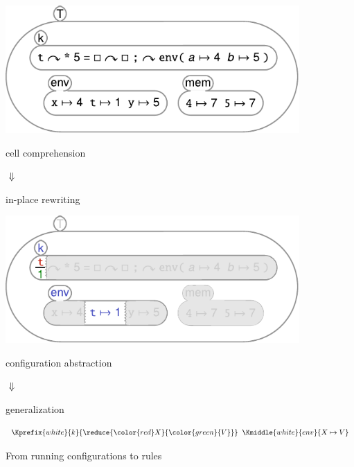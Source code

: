 \documentclass{article}
\begin{document}
\begin{figure}
\begin{center}
\includegraphics{figs/read-env-2}
\end{center}
\begin{minipage}{.44\columnwidth}
\begin{flushright}
cell comprehension
\end{flushright}
\end{minipage}
{\Huge$\mbox{\normalsize}\Downarrow\mbox{\normalsize }$}
\begin{minipage}{.44\columnwidth}
in-place rewriting
\end{minipage}
\begin{center}
\includegraphics{figs/read-env2}
\end{center}
\begin{minipage}{.44\columnwidth}
\begin{flushright}
configuration abstraction
\end{flushright}
\end{minipage}
{\Huge$\mbox{\normalsize}\Downarrow\mbox{\normalsize }$}
\begin{minipage}{.44\columnwidth}
generalization
\end{minipage}
\[
\Kprefix{white}{k}{\reduce{\color{red}X}{\color{green}{V}}}\mathrel{}\Kmiddle{white}{env}{X\mapsto V}
\]
\caption{From running configurations to \K rules}\label{fig:k-rules}
\end{figure}
\end{document}
